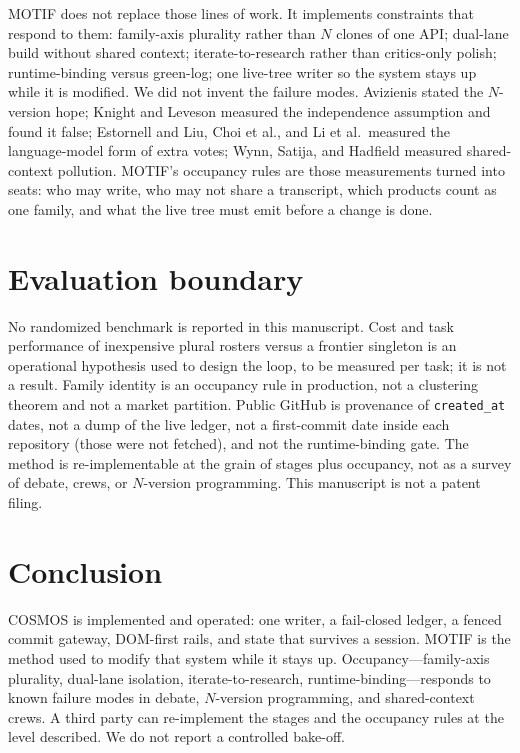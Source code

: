 \documentclass[11pt]{article}
\begin{document}
MOTIF does not replace those lines of work. It implements constraints
that respond to them: family-axis plurality rather than $N$ clones of
one API; dual-lane build without shared context; iterate-to-research
rather than critics-only polish; runtime-binding versus green-log; one
live-tree writer so the system stays up while it is modified. We did
not invent the failure modes. Avizienis stated the $N$-version hope;
Knight and Leveson measured the independence assumption and found it
false; Estornell and Liu, Choi et al., and Li et al.\ measured the
language-model form of extra votes; Wynn, Satija, and Hadfield measured
shared-context pollution. MOTIF's occupancy rules are those
measurements turned into seats: who may write, who may not share a
transcript, which products count as one family, and what the live tree
must emit before a change is done.

\section{Evaluation boundary}

No randomized benchmark is reported in this manuscript. Cost and task
performance of inexpensive plural rosters versus a frontier singleton
is an operational hypothesis used to design the loop, to be measured
per task; it is not a result. Family identity is an occupancy rule in
production, not a clustering theorem and not a market partition.
Public GitHub is provenance of \texttt{created\_at} dates, not a dump
of the live ledger, not a first-commit date inside each repository
(those were not fetched), and not the runtime-binding gate. The method
is re-implementable at the grain of stages plus occupancy, not as a
survey of debate, crews, or $N$-version programming. This manuscript
is not a patent filing.

\section{Conclusion}

COSMOS is implemented and operated: one writer, a fail-closed ledger,
a fenced commit gateway, DOM-first rails, and state that survives a
session. MOTIF is the method used to modify that system while it stays
up. Occupancy---family-axis plurality, dual-lane isolation,
iterate-to-research, runtime-binding---responds to known failure modes
in debate, $N$-version programming, and shared-context crews. A third
party can re-implement the stages and the occupancy rules at the level
described. We do not report a controlled bake-off.
\end{document}
